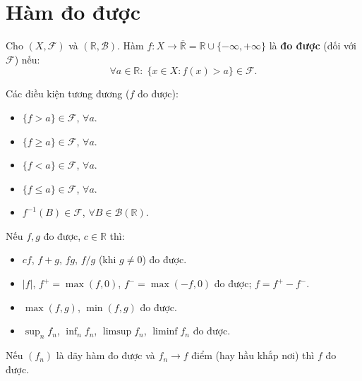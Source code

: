 \documentclass[12pt,a4paper]{article}
\begin{document}
\section{Hàm đo được}

\begin{dinhnghia}
  Cho $(X, \mathcal{F})$ và $(\mathbb{R}, \mathcal{B})$. Hàm $f: X \to \overline{\mathbb{R}} = \mathbb{R} \cup \{-\infty, +\infty\}$ là \textbf{đo được} (đối với $\mathcal{F}$) nếu:
  \[
    \forall a \in \mathbb{R}:\; \{x \in X : f(x) > a\} \in \mathcal{F}.
  \]
\end{dinhnghia}

\begin{tinhchat}
  Các điều kiện tương đương ($f$ đo được):
  \begin{itemize}
    \item $\{f > a\} \in \mathcal{F}$, $\forall a$.
    \item $\{f \ge a\} \in \mathcal{F}$, $\forall a$.
    \item $\{f < a\} \in \mathcal{F}$, $\forall a$.
    \item $\{f \le a\} \in \mathcal{F}$, $\forall a$.
    \item $f^{-1}(B) \in \mathcal{F}$, $\forall B \in \mathcal{B}(\mathbb{R})$.
  \end{itemize}
\end{tinhchat}

\begin{tinhchat}[title={Phép toán trên hàm đo được}]
  Nếu $f, g$ đo được, $c \in \mathbb{R}$ thì:
  \begin{itemize}
    \item $cf$, \;$f + g$, \;$fg$, \;$f/g$ (khi $g \ne 0$) đo được.
    \item $|f|$, \;$f^+ = \max(f, 0)$, \;$f^- = \max(-f, 0)$ đo được; $f = f^+ - f^-$.
    \item $\max(f, g)$, \;$\min(f, g)$ đo được.
    \item $\sup_n f_n$, \;$\inf_n f_n$, \;$\limsup f_n$, \;$\liminf f_n$ đo được.
  \end{itemize}
\end{tinhchat}

\begin{dinhly}
  Nếu $(f_n)$ là dãy hàm đo được và $f_n \to f$ điểm (hay hầu khắp nơi) thì $f$ đo được.
\end{dinhly}
\end{document}
